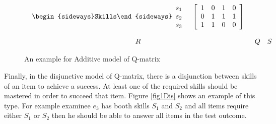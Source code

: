 \begin{figure}
\begin{footnotesize}
\[\begin{array}{ccc}
\begin{array}{cc}
\mathrm{\begin{sideways}Skills\end{sideways}}\begin{array}{c}
s_{1}\\
s_{2}\\
s_{3}
\end{array} & \left[\begin{array}{cccc}
1 & 0 & 1 & 0\\
0 & 1 & 1 & 1\\
1 & 1 & 0 & 0
\end{array}\right]
\end{array}\\
\\
R & Q & S
\end{array}
\]
 \end{footnotesize} \caption{An example for Additive model of Q-matrix}


\label{fig1Add} 
\end{figure}

Finally, in the disjunctive model of Q-matrix, there is a disjunction between skills of an item to achieve a success. At least one of the required skills should be mastered in order to succeed that item. Figure \ref{fig1Dis} shows an example of this type. For example examinee $e_{3}$ has booth skills $S_{1}$ and $S_{2}$ and all items require either $S_{1}$ or $S_{2}$ then he should be able to answer all items in the test outcome. 



